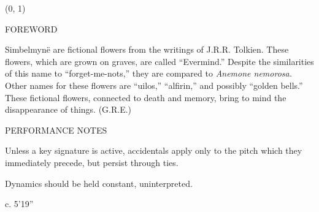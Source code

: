 \documentclass[11pt]{article}
\newcommand*\circled[1]{\tikz[baseline=(char.base)]{
            \node[shape=circle,draw,inner sep=1pt] (char) {#1};}}
\begin{document}
\begin{textblock}{23}(0, 1)
\begin{center}
\huge FOREWORD
\end{center}
\end{textblock}

\vspace*{0.25\baselineskip}

\begingroup
\begin{center}
Simbelmyn\"e are fictional flowers from the writings of J.R.R. Tolkien. These flowers, which are grown on graves, are called ``Evermind.'' Despite the similarities of this name to ``forget-me-nots,'' they are compared to \textit{Anemone nemorosa.} Other names for these flowers are ``uilos,'' ``alfirin,'' and possibly ``golden bells.'' These fictional flowers, connected to death and memory, bring to mind the disappearance of things.
\rightskip\leftskip
\phantom{text} \hfill (G.R.E.)
\end{center}
\endgroup

\vspace*{0.25\baselineskip}

\begin{center}
\huge PERFORMANCE NOTES
\end{center}

\begingroup
\begin{center}
\pmb{\circled{1}} Unless a key signature is active, accidentals apply only to the pitch which they immediately precede, but persist through ties.
\rightskip\leftskip
\phantom{text} \hfill \phantom{()}
\end{center}

\begin{center}
\pmb{\circled{2}} Dynamics should be held constant, uninterpreted.
\rightskip\leftskip
\phantom{text} \hfill \phantom{()}
\end{center}
\endgroup

\vspace*{15\baselineskip}

\begin{center}
c. 5'19''
\end{center}
\end{document}
